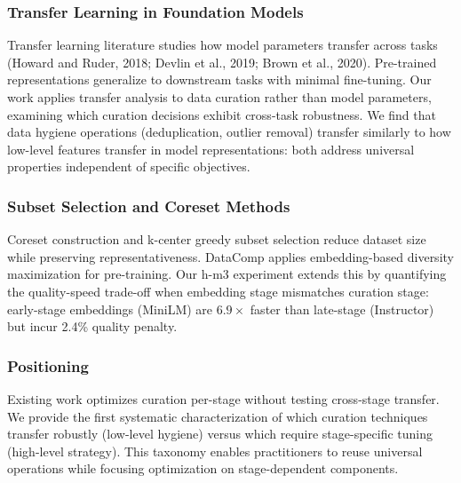\subsubsection{Transfer Learning in Foundation Models}

Transfer learning literature studies how model parameters transfer across tasks (Howard and Ruder, 2018; Devlin et al., 2019; Brown et al., 2020). Pre-trained representations generalize to downstream tasks with minimal fine-tuning. Our work applies transfer analysis to data curation rather than model parameters, examining which curation decisions exhibit cross-task robustness. We find that data hygiene operations (deduplication, outlier removal) transfer similarly to how low-level features transfer in model representations: both address universal properties independent of specific objectives.

\subsubsection{Subset Selection and Coreset Methods}

Coreset construction \citep{Feldman2011Scalable} and k-center greedy subset selection \citep{Sener2018Active} reduce dataset size while preserving representativeness. DataComp applies embedding-based diversity maximization for pre-training. Our h-m3 experiment extends this by quantifying the quality-speed trade-off when embedding stage mismatches curation stage: early-stage embeddings (MiniLM) are 6.$9\times$ faster than late-stage (Instructor) but incur 2.4\% quality penalty.

\subsubsection{Positioning}

Existing work optimizes curation per-stage without testing cross-stage transfer. We provide the first systematic characterization of which curation techniques transfer robustly (low-level hygiene) versus which require stage-specific tuning (high-level strategy). This taxonomy enables practitioners to reuse universal operations while focusing optimization on stage-dependent components.
